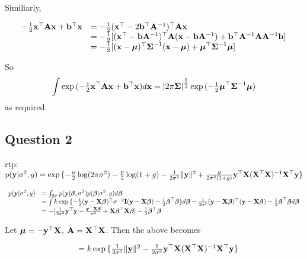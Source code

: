 \documentclass{article}[12pt]
\begin{document}
Similiarly,

\begin{equation*}
\begin{array}{ll}
-\tfrac{1}{2} {\bf x}^\top {\bf A} {\bf x} + {\bf b}^\top {\bf x} &= -\tfrac{1}{2}({\bf x}^\top -2{\bf b}^\top {\bf A}^{-1})^\top {\bf A} {\bf x} \\
&= -\tfrac{1}{2} [({\bf x}^\top - {\bf b} {\bf A}^{-1})^\top {\bf A} ({\bf x} - {\bf b} {\bf A}^{-1}) + {\bf b}^\top {\bf A}^{-1} {\bf A} {\bf A}^{-1} {\bf b}] \\
&= -\tfrac{1}{2} [({\bf x} - {\boldsymbol \mu})^\top {\boldsymbol\Sigma}^{-1} ({\bf x} - {\boldsymbol \mu}) + {\boldsymbol \mu}^\top {\boldsymbol\Sigma}^{-1} {\boldsymbol \mu}]
\end{array}
\end{equation*}

So
\begin{equation*}
\int \exp{(- \tfrac{1}{2} {\bf x}^\top {\bf A}{\bf x}+ {\bf b}^\top {\bf x})} d{\bf x} = |2 \pi {\boldsymbol\Sigma}|^{\tfrac{1}{2}} \exp{(- \tfrac{1}{2} {\boldsymbol\mu}^\top {\boldsymbol\Sigma}^{-1} {\boldsymbol\mu})}
\end{equation*}
as required.
\subsection{Question 2}

rtp: $p({\bf y} | \sigma^2, g) = \exp{\{ - \frac{n}{2} \log (2 \pi \sigma^2) - \frac{p}{2} \log(1 + g) - \frac{1}{2 \sigma^2} \| {\bf y}\|^2  + \frac{g}{2 \sigma^2 (1 + g)} {\bf y}^\top {\bf X}({\bf X}^\top {\bf X})^{-1} {\bf X}^\top {\bf y}\}}$

\begin{equation*}
\begin{array}{ll}
p({\bf y} | \sigma^2, g) &= \int_{{\mathbb R}^p} p({\bf y} | {\boldsymbol \beta}, \sigma^2) p({\boldsymbol \beta} | \sigma^2, g) d {\boldsymbol \beta} \\
&= \int k \exp{\{ - \tfrac{1}{2} ({\bf y}- {\bf X}{\boldsymbol\beta})^\top \sigma^{-2} {\bf I}({\bf y}- {\bf X}{\boldsymbol\beta}) -  \tfrac{1}{2} {\boldsymbol\beta}^\top {\boldsymbol\beta}\}} d {\boldsymbol \beta} - \frac{1}{2 \sigma^2} ({\bf y} - {\bf X} {\boldsymbol \beta})^\top ({\bf y} - {\bf X} {\boldsymbol \beta}) -\tfrac{1}{2} {\boldsymbol \beta}^\top {\boldsymbol\beta} d {\boldsymbol \beta} \\
&= -[\frac{1}{2 \sigma^2} {\bf y}^\top {\bf y} - \frac{{\bf y}^\top {\bf X} {\boldsymbol\beta}}{\sigma^2} + {\bf X} {\boldsymbol \beta}^\top {\bf X} {\boldsymbol\beta}] - \tfrac{1}{2} {\boldsymbol \beta}^\top {\boldsymbol\beta}
\end{array}
\end{equation*}

Let ${\boldsymbol \mu} = -{\bf y}^\top {\bf X}$, ${\bf A} = {\bf X}^\top {\bf X}$. Then the above becomes

\begin{equation*}
\begin{array}{ll}
&= k \exp{ \{ \frac{1}{2 \sigma^2} \| {\bf y}\|^2 - \frac{1}{2 \sigma^2} {\bf y}^\top {\bf X}({\bf X}^\top {\bf X})^{-1} {\bf X}^\top {\bf y}\} }
\end{array}
\end{equation*}
\end{document}
